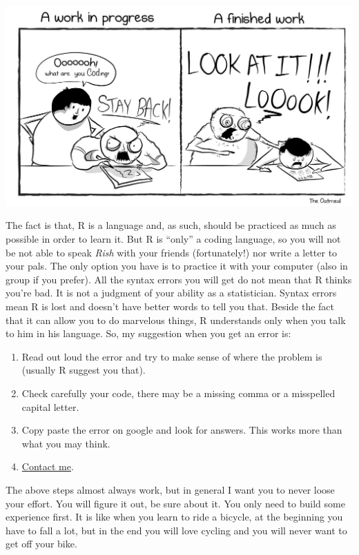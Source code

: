 \documentclass[
]{svmono}
\begin{document}
\begin{center}\includegraphics[width=0.8\linewidth,]{images/8psue2xkvn811} \end{center}

The fact is that, R is a language and, as such, should be practiced as
much as possible in order to learn it. But R is ``only'' a coding
language, so you will not be not able to speak \emph{Rish} with your friends
(fortunately!) nor write a letter to your pals. The only option you have
is to practice it with your computer (also in group if you prefer). All
the syntax errors you will get do not mean that R thinks you're bad. It
is not a judgment of your ability as a statistician. Syntax errors mean
R is lost and doesn't have better words to tell you that. Beside the
fact that it can allow you to do marvelous things, R understands only
when you talk to him in his language. So, my suggestion when you get an
error is:

\begin{enumerate}
\def\labelenumi{\arabic{enumi}.}
\item
  Read out loud the error and try to make sense of where the problem
  is (usually R suggest you that).
\item
  Check carefully your code, there may be a missing comma or a
  misspelled capital letter.
\item
  Copy paste the error on google and look for answers. This works more
  than what you may think.
\item
  \href{mailto:info@federicoroscioli.com}{Contact me}.
\end{enumerate}

The above steps almost always work, but in general I want you to never
loose your effort. You will figure it out, be sure about it. You only
need to build some experience first. It is like when you learn to ride a
bicycle, at the beginning you have to fall a lot, but in the end you
will love cycling and you will never want to get off your bike.
\end{document}
